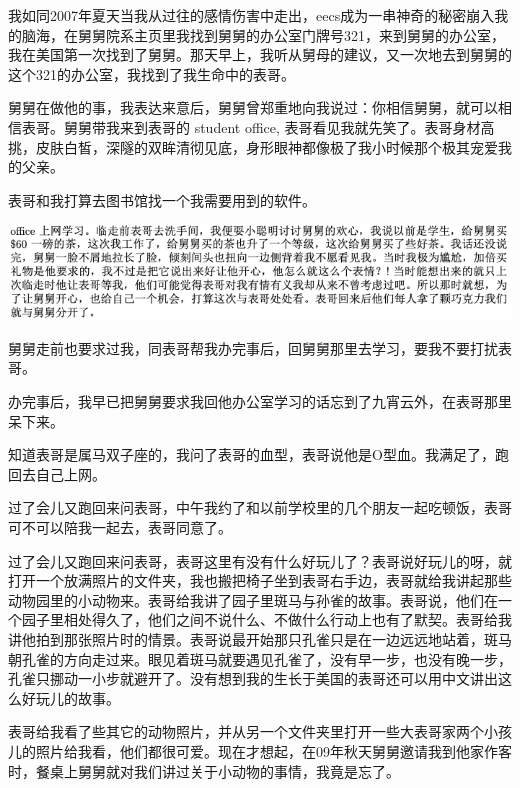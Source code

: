 \documentclass[9pt, b5paper]{article}
\begin{document}
我如同2007年夏天当我从过往的感情伤害中走出，eecs成为一串神奇的秘密崩入我的脑海，在舅舅院系主页里我找到舅舅的办公室门牌号321，来到舅舅的办公室，我在美国第一次找到了舅舅。那天早上，我听从舅母的建议，又一次地去到舅舅的这个321的办公室，我找到了我生命中的表哥。

舅舅在做他的事，我表达来意后，舅舅曾郑重地向我说过：你相信舅舅，就可以相信表哥。舅舅带我来到表哥的 student office, 表哥看见我就先笑了。表哥身材高挑，皮肤白皙，深隧的双眸清彻见底，身形眼神都像极了我小时候那个极其宠爱我的父亲。

表哥和我打算去图书馆找一个我需要用到的软件。

\begin{center}
\includegraphics[width=.9\linewidth]{./pic/p1p41.png}
\end{center}

舅舅走前也要求过我，同表哥帮我办完事后，回舅舅那里去学习，要我不要打扰表哥。

办完事后，我早已把舅舅要求我回他办公室学习的话忘到了九宵云外，在表哥那里呆下来。

知道表哥是属马双子座的，我问了表哥的血型，表哥说他是O型血。我满足了，跑回去自己上网。

过了会儿又跑回来问表哥，中午我约了和以前学校里的几个朋友一起吃顿饭，表哥可不可以陪我一起去，表哥同意了。 

过了会儿又跑回来问表哥，表哥这里有没有什么好玩儿了？表哥说好玩儿的呀，就打开一个放满照片的文件夹，我也搬把椅子坐到表哥右手边，表哥就给我讲起那些动物园里的小动物来。表哥给我讲了园子里斑马与孙雀的故事。表哥说，他们在一个园子里相处得久了，他们之间不说什么、不做什么行动上也有了默契。表哥给我讲他拍到那张照片时的情景。表哥说最开始那只孔雀只是在一边远远地站着，斑马朝孔雀的方向走过来。眼见着斑马就要遇见孔雀了，没有早一步，也没有晚一步，孔雀只挪动一小步就避开了。没有想到我的生长于美国的表哥还可以用中文讲出这么好玩儿的故事。

表哥给我看了些其它的动物照片，并从另一个文件夹里打开一些大表哥家两个小孩儿的照片给我看，他们都很可爱。现在才想起，在09年秋天舅舅邀请我到他家作客时，餐桌上舅舅就对我们讲过关于小动物的事情，我竟是忘了。
\end{document}
